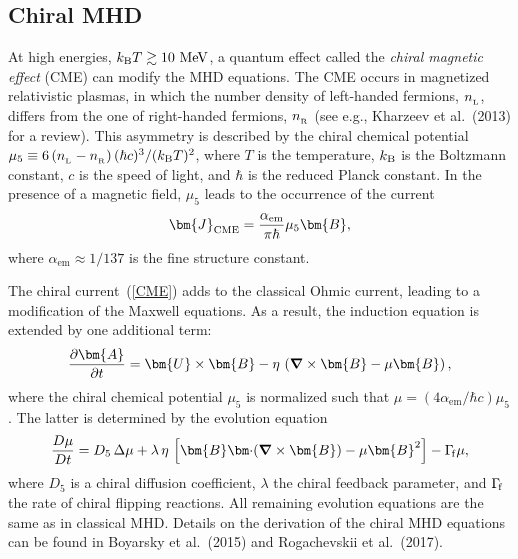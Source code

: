\documentclass[\mydriver,12pt,twoside,notitlepage,a4paper]{article}
\newcommand{\nab}{\mbox{\boldmath $\nabla$} {}}
\begin{document}
\subsection{Chiral MHD}

At high energies, $k_{\rm B} T \gtrsim 10~\mathrm{MeV}$, a quantum effect called the 
\textit{chiral magnetic effect} (CME) can modify the MHD equations. 
The CME occurs in magnetized relativistic plasmas, in
which the number density of left-handed fermions,
$n_{_{\rm L}}$, differs from the one of right-handed
fermions, $n_{_{\rm R}}$ (see e.g., Kharzeev et al.\ (2013) for a review).
This asymmetry is described by the chiral chemical potential
$\mu_5 \equiv 6\,(n_{_{\rm L}}-n_{_{\rm R}})\,{(\hbar c)^3/(k_{\rm B}  T)^2}$, 
where $T$ is the temperature, $k_{\rm B}$ is the Boltzmann constant,
$c$ is the speed of light, and $\hbar$ is the reduced Planck constant.
In the presence of a magnetic field, $\mu_5$ leads to the occurrence of the current
\begin{eqnarray}
   \bm{J}_{\rm CME} = \frac{\alpha_\mathrm{em}}{\pi \hbar} \mu_5 \bm{B} ,
  \label{CME}
\end{eqnarray}
where $\alpha_\mathrm{em} \approx 1/137$ is the fine structure constant.

The chiral current~(\ref{CME}) adds to the classical Ohmic current, leading
to a modification of the Maxwell equations.
As a result, the induction equation is extended by one 
additional term:
\begin{eqnarray}
  \frac{\partial \bm{A}}{\partial t} = {\bm{U}} \times   {\bm{B}}
  - \eta \, \left(\nab   \times   {\bm{B}}
  - \mu {\bm{B}} \right), 
\label{ind-DNS}
\end{eqnarray}
where the chiral chemical potential $\mu_5$ is normalized such that
$\mu = (4 \alpha_\mathrm{em} /\hbar c) \mu_5$.
The latter is determined by the evolution equation
\begin{eqnarray}
  \frac{D \mu}{D t} = D_5 \, \Delta \mu
  + \lambda \, \eta \, \left[{\bm{B}} {\bm \cdot} (\nab   \times   {\bm{B}})
  - \mu {\bm{B}}^2\right]
  -\Gamma_{\rm\!f}\mu,
\label{mu-DNS}
\end{eqnarray}
where $D_5$ is a chiral diffusion coefficient, $\lambda$ the chiral feedback parameter, and $\Gamma_{\rm\!f}$ the rate of chiral flipping reactions.
All remaining evolution equations are the same as in classical MHD. 
Details on the derivation of the chiral MHD equations can be found in 
Boyarsky et al.\ (2015) and Rogachevskii et al.\ (2017).
\end{document}
